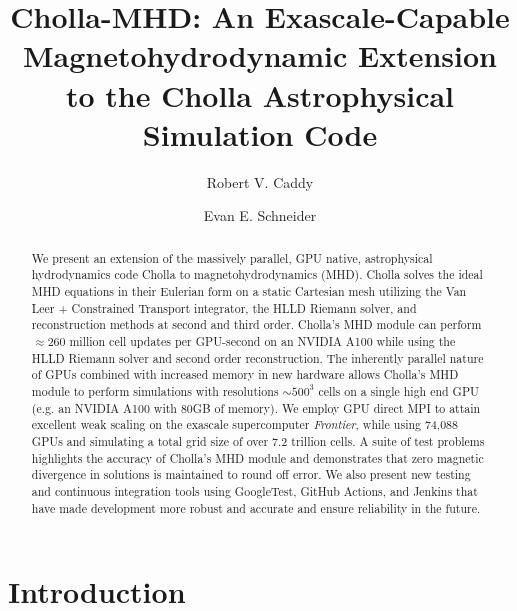 \documentclass[modern]{aastex631}
\begin{document}
\title{Cholla-MHD: An Exascale-Capable Magnetohydrodynamic Extension to the Cholla Astrophysical Simulation Code}

\author[0000-0002-4475-3181]{Robert V. Caddy}

\author[0000-0001-9735-7484]{Evan E. Schneider}

\begin{abstract}

    We present an extension of the massively parallel, GPU native, astrophysical hydrodynamics code Cholla to magnetohydrodynamics (MHD).
    Cholla solves the ideal MHD equations in their Eulerian form on a static Cartesian mesh utilizing the Van Leer + Constrained Transport integrator, the HLLD Riemann solver, and reconstruction methods at second and third order.
    Cholla's MHD module can perform $\approx260$ million cell updates per GPU-second on an NVIDIA A100 while using the HLLD Riemann solver and second order reconstruction.
    The inherently parallel nature of GPUs combined with increased memory in new hardware allows Cholla's MHD module to perform simulations with resolutions $\sim500^3$ cells on a single high end GPU (e.g. an NVIDIA A100 with 80GB of memory).
    We employ GPU direct MPI to attain excellent weak scaling on the exascale supercomputer \textit{Frontier}, while using 74,088 GPUs and simulating a total grid size of over 7.2 trillion cells.
    A suite of test problems highlights the accuracy of Cholla's MHD module and demonstrates that zero magnetic divergence in solutions is maintained to round off error.
    We also present new testing and continuous integration tools using GoogleTest, GitHub Actions, and Jenkins that have made development more robust and accurate and ensure reliability in the future.

    \end{abstract}


\section{Introduction}
\label{sec:intro}
\end{document}
